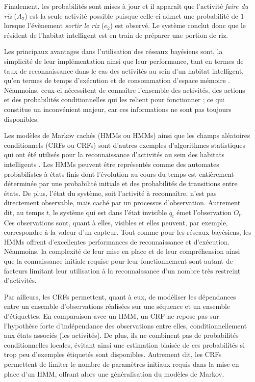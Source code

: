 \noindent Finalement, les probabilités sont mises à jour et il apparaît que l’activité \og \textit{faire du riz} \fg ($A_2$) est la seule activité possible puisque celle-ci admet une probabilité de $1$ lorsque l'évènement \og \textit{sortir le riz} \fg ($e_2$) est observé. Le système conclut donc que le résident de l'habitat intelligent est en train de préparer une portion de riz.

Les principaux avantages dans l'utilisation des réseaux bayésiens sont, la simplicité de leur implémentation ainsi que leur performance, tant en termes de taux de reconnaissance dans le cas des activités au sein d'un habitat intelligent, qu'en termes de temps d'exécution et de consommation d'espace mémoire \citep{Friedman1997}. Néanmoins, ceux-ci nécessitent de connaître l'ensemble des activités, des actions et des probabilités conditionnelles qui les relient pour fonctionner ; ce qui constitue un inconvénient majeur, car ces informations ne sont pas toujours disponibles.

Les modèles de Markov cachés (\aclp{HMM} ou \acsp{HMM}) ainsi que les champs aléatoires conditionnels (\aclp{CRF} ou \acsp{CRF}) sont d'autres exemples d'algorithmes statistiques qui ont été utilisés pour la reconnaissance d'activités au sein des habitats intelligents \citep{Oliver2004, Nazerfard2010, VanKasteren2011}. Les \acsp{HMM} peuvent être représentés comme des automates probabilistes à états finis dont l'évolution au cours du temps est entièrement déterminée par une probabilité initiale et des probabilités de transitions entre états. De plus, l'état du système, soit l'activité à reconnaître, n'est pas directement observable, mais caché par un processus d'observation. Autrement dit, au temps $t$, le système qui est dans l'état invisible $q_t$ émet l'observation $O_t$. Ces observations sont, quant à elles, visibles et elles peuvent, par exemple, correspondre à la valeur d'un capteur. Tout comme pour les réseaux bayésiens, les \acsp{HMM} offrent d’excellentes performances de reconnaissance et d’exécution. Néanmoins, la complexité de leur mise en place et de leur compréhension ainsi que la connaissance initiale requise pour leur fonctionnement sont autant de facteurs limitant leur utilisation à la reconnaissance d'un nombre très restreint d’activités.

Par ailleurs, les \acsp{CRF} permettent, quant à eux, de modéliser les dépendances entre un ensemble d’observations réalisées sur une séquence et un ensemble d’étiquettes. En comparaison avec un \acs{HMM}, un \acs{CRF} ne repose pas sur l’hypothèse forte d’indépendance des observations entre elles, conditionnellement aux états associés (les activités). De plus, ils ne combinent pas de probabilités conditionnelles locales, évitant ainsi une estimation biaisée de ces probabilités si trop peu d’exemples étiquetés sont disponibles. Autrement dit, les \acsp{CRF} permettent de limiter le nombre de paramètres initiaux requis dans la mise en place d'un \acs{HMM}, offrant alors une généralisation du modèles de Markov.

